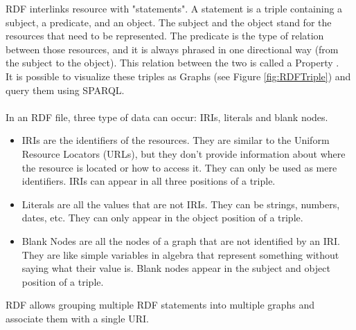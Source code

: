 RDF interlinks resource with "statements". A statement is a triple containing a subject, a predicate, and an object.
The subject and the object stand for the resources that need to be represented. The predicate is the type of relation between those resources, and it is always phrased in one directional way (from the subject to the object). This relation between the two is called a Property \cite{rdf}.
\\
It is possible to visualize these triples as Graphs (see Figure \ref{fig:RDFTriple}) and query them using SPARQL.
\\
\\
In an RDF file, three type of data can occur: IRIs, literals and blank nodes. 
\begin{itemize}
	\item IRIs are the identifiers of the resources. They are similar to the Uniform Resource Locators (URLs), but they don't provide information about where the resource is located or how to access it. They can only be used as mere identifiers. IRIs can appear in all three positions of a triple. 
	\item Literals are all the values that are not IRIs. They can be strings, numbers, dates, etc. They can only appear in the object position of a triple.
	\item Blank Nodes are all the nodes of a graph that are not identified by an IRI. They are like simple variables in algebra that represent something without saying what their value is. Blank nodes appear in the subject and object position of a triple. 
\end{itemize}
RDF allows grouping multiple RDF statements into multiple graphs and associate them with a single URI. 

